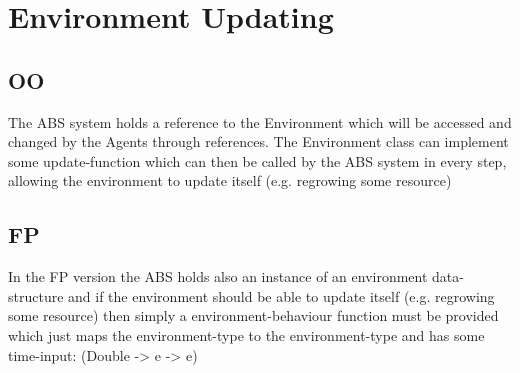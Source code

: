 \chapter{Environment Updating}

\section{OO}
The ABS system holds a reference to the Environment which will be accessed and changed by the Agents through references. The Environment class can implement some update-function which can then be called by the ABS system in every step, allowing the environment to update itself (e.g. regrowing some resource)

\section{FP}
In the FP version the ABS holds also an instance of an environment data-structure and if the environment should be able to update itself (e.g. regrowing some resource) then simply a environment-behaviour function must be provided which just maps the environment-type to the environment-type and has some time-input: (Double -> e -> e)